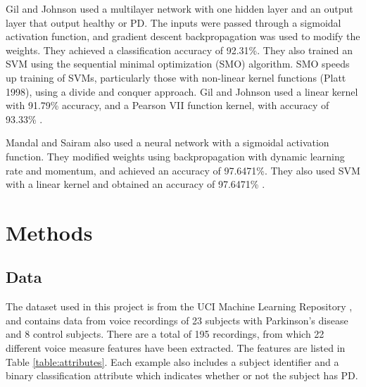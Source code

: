 \documentclass[draftcopy]{srpaper}
\begin{document}
Gil and Johnson used a multilayer network with one hidden layer
and an output layer that output healthy or PD. The inputs were passed
through a sigmoidal activation function, and gradient descent
backpropagation was used to modify the weights. They achieved a
classification accuracy of 92.31\%.
They also trained an SVM using the sequential minimal
optimization (SMO) algorithm. SMO speeds up training
of SVMs, particularly those with non-linear kernel functions (Platt
1998), using a divide and conquer approach. Gil and Johnson used a
linear kernel with 91.79\% accuracy, and a Pearson VII function
kernel, with accuracy of 93.33\% \cite{GJ70}.

Mandal and Sairam also used a neural network with a sigmoidal activation function. They modified weights using backpropagation with dynamic
learning rate and momentum, and achieved an accuracy of 97.6471\%.
They also used SVM with a linear kernel and obtained an
accuracy of 97.6471\% \cite{MS12}.

 \chapter{Methods}
 \label{Chapter:Three}

\section{Data}
The dataset used in this project is from the UCI Machine Learning
Repository \cite{Bache+Lichman:2013}, and contains data from voice
recordings of 23
subjects with Parkinson's disease and 8 control subjects. There are a
total of 195 recordings, from which 22 different voice
measure features have been extracted. The features are listed in
Table \ref{table:attributes}. Each example also includes a subject
identifier and a binary classification attribute which
indicates whether or not the subject has PD.
\end{document}
